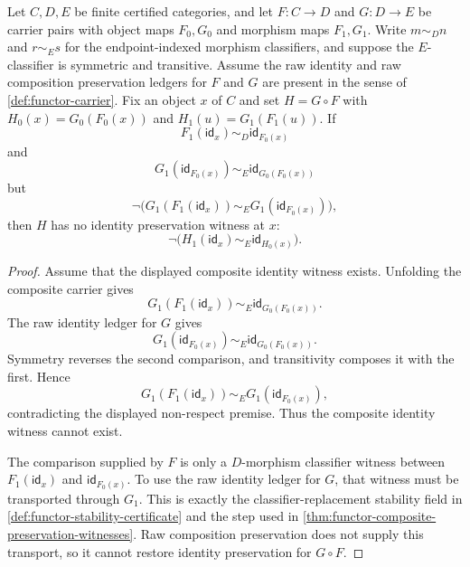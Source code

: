 \begin{proposition}
\label{prop:functor-composition-identity-sameness-respect-required}
Let $C,D,E$ be finite certified categories, and let $F:C\to D$ and $G:D\to E$ be carrier pairs with object maps $F_0,G_0$ and morphism maps $F_1,G_1$. Write $m\sim_D n$ and $r\sim_E s$ for the endpoint-indexed morphism classifiers, and suppose the $E$-classifier is symmetric and transitive. Assume the raw identity and raw composition preservation ledgers for $F$ and $G$ are present in the sense of \autoref{def:functor-carrier}. Fix an object $x$ of $C$ and set $H=G\circ F$ with $H_0(x)=G_0(F_0(x))$ and $H_1(u)=G_1(F_1(u))$. If
$$
F_1(\mathsf{id}_x)\sim_D \mathsf{id}_{F_0(x)}
$$
and
$$
G_1(\mathsf{id}_{F_0(x)})\sim_E \mathsf{id}_{G_0(F_0(x))}
$$
but
$$
\neg\bigl(G_1(F_1(\mathsf{id}_x))\sim_E G_1(\mathsf{id}_{F_0(x)})\bigr),
$$
then $H$ has no identity preservation witness at $x$:
$$
\neg\bigl(H_1(\mathsf{id}_x)\sim_E \mathsf{id}_{H_0(x)}\bigr).
$$
\end{proposition}
\begin{proof}
Assume that the displayed composite identity witness exists. Unfolding the composite carrier gives
$$
G_1(F_1(\mathsf{id}_x))\sim_E \mathsf{id}_{G_0(F_0(x))}.
$$
The raw identity ledger for $G$ gives
$$
G_1(\mathsf{id}_{F_0(x)})\sim_E \mathsf{id}_{G_0(F_0(x))}.
$$
Symmetry reverses the second comparison, and transitivity composes it with the first. Hence
$$
G_1(F_1(\mathsf{id}_x))\sim_E G_1(\mathsf{id}_{F_0(x)}),
$$
contradicting the displayed non-respect premise. Thus the composite identity witness cannot exist.

The comparison supplied by $F$ is only a $D$-morphism classifier witness between $F_1(\mathsf{id}_x)$ and $\mathsf{id}_{F_0(x)}$. To use the raw identity ledger for $G$, that witness must be transported through $G_1$. This is exactly the classifier-replacement stability field in \autoref{def:functor-stability-certificate} and the step used in \autoref{thm:functor-composite-preservation-witnesses}. Raw composition preservation does not supply this transport, so it cannot restore identity preservation for $G\circ F$.
\end{proof}

